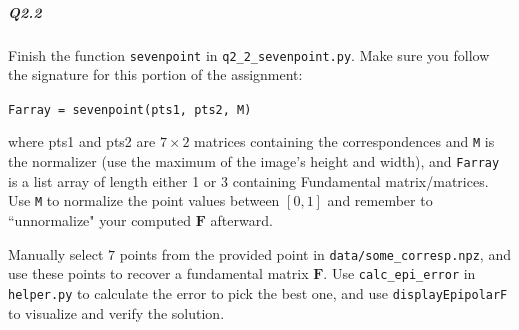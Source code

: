 \subparagraph*{Q2.2} 
Finish the function \texttt{sevenpoint} in \texttt{q2\_2\_sevenpoint.py}. Make sure you follow the signature for this portion of the assignment:
\begin{center}
    \texttt{Farray = sevenpoint(pts1, pts2, M)}
\end{center}
where pts1 and pts2 are $7 \times 2$ matrices containing the correspondences and \texttt{M} is the normalizer (use the maximum of the image's height and width), and \texttt{Farray} is a list array of length either 1 or 3 containing Fundamental matrix/matrices. Use \texttt{M} to normalize the point values between $[0,1]$ and remember to ``unnormalize" your computed $\textbf{F}$ afterward.

Manually select $7$ points from the provided point in \texttt{data/some\_corresp.npz}, and use these points to recover a fundamental matrix $\textbf{F}$. Use \texttt{calc\_epi\_error} in \texttt{helper.py} to calculate the error to pick the best one, and use \texttt{displayEpipolarF} to visualize and verify the solution.


